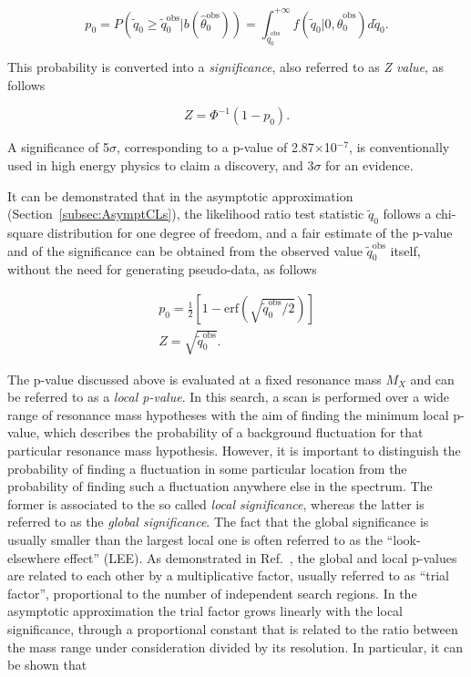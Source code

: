 \begin{equation}
p_0 = P(\tilde{q}_0 \geq \tilde{q}_0^\mathrm{obs}|b(\hat{\theta}_0^\mathrm{obs})) = \int_{\tilde{q}_0^\mathrm{obs}}^{+\infty} f(\tilde{q}_0|0,\hat{\theta}_0^\mathrm{obs})d\tilde{q}_0.
\end{equation}

This probability is converted into a \textit{significance}, also referred to as \textit{Z value}, as follows

\begin{equation}
Z = \Phi^{-1} (1-p_0).
\end{equation}

A significance of 5$\sigma$, corresponding to a p-value of 2.87$\times$10$^{-7}$, is conventionally used in high energy physics to claim a discovery,
and 3$\sigma$ for an evidence.

It can be demonstrated that in the asymptotic approximation (Section~\ref{subsec:AsymptCLs}), the likelihood ratio test statistic $\tilde{q}_0$
follows a chi-square distribution for one degree of freedom, and a fair estimate of the p-value and of the significance can be obtained from the observed value $\tilde{q}_0^\mathrm{obs}$ itself,
without the need for generating pseudo-data, as follows

\begin{equation}
\begin{gathered}
p_0 = \frac{1}{2} [ 1 - \mathrm{erf}(\sqrt{\tilde{q}_0^\mathrm{obs}/2}) ] \\
Z = \sqrt{\tilde{q}_0^\mathrm{obs}}.
\end{gathered}
\end{equation}

The p-value discussed above is evaluated at a fixed resonance mass $M_X$ and can be referred to as a \textit{local p-value}.
In this search, a scan is performed over a wide range of resonance mass hypotheses with the aim of finding
the minimum local p-value, which describes the probability of a background fluctuation for that particular resonance mass hypothesis.
However, it is important to distinguish the probability of finding a fluctuation in some particular location from the probability of finding such a fluctuation anywhere else in the spectrum.
The former is associated to the so called \textit{local significance}, whereas the latter is referred to as the \textit{global significance}.
The fact that the global significance is usually smaller than the largest local one is often referred to as the ``look-elsewhere effect'' (LEE).
As demonstrated in Ref.~\cite{Gross:2010qma}, the global and local p-values are related to each other by a multiplicative factor, usually referred to as ``trial factor'', proportional to the number of independent search regions.
In the asymptotic approximation the trial factor grows linearly with the local significance, through a proportional constant
that is related to the ratio between the mass range under consideration divided by its resolution. In particular, it can be shown that

